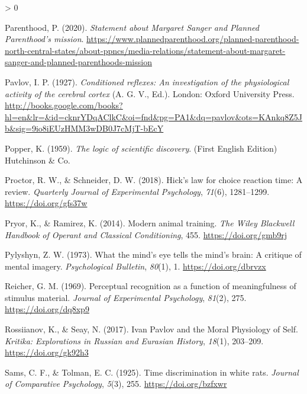 \documentclass[
  oneside,
  12pt]{crumpbook}
\newlength{\cslhangindent}
\newenvironment{CSLReferences}[2] %
 {%
  \setlength{\parindent}{0pt}
  \ifodd #1 \everypar{\setlength{\hangindent}{\cslhangindent}}\ignorespaces\fi
  \ifnum #2 > 0
  \setlength{\parskip}{#2\baselineskip}
  \fi
 }%
 {}
\begin{document}
\begin{CSLReferences}{1}{0}
\leavevmode\hypertarget{ref-plannedparenthoodStatementMargaretSanger2020}{}%
Parenthood, P. (2020). \emph{Statement about {Margaret Sanger} and {Planned Parenthood}'s mission}. \url{https://www.plannedparenthood.org/planned-parenthood-north-central-states/about-ppncs/media-relations/statement-about-margaret-sanger-and-planned-parenthoods-mission}

\leavevmode\hypertarget{ref-pavlovConditionedReflexesInvestigation1927}{}%
Pavlov, I. P. (1927). \emph{Conditioned reflexes: {An} investigation of the physiological activity of the cerebral cortex} (A. G. V., Ed.). {London: Oxford University Press}. \url{http://books.google.com/books?hl=en\&lr=\&id=cknrYDqAClkC\&oi=fnd\&pg=PA1\&dq=pavlov\&ots=KAnkq8Z5Jb\&sig=9io8iEUzHMM3wDB0J7cMjT-bEcY}

\leavevmode\hypertarget{ref-popperLogicScientificDiscovery1959}{}%
Popper, K. (1959). \emph{The logic of scientific discovery}. {(First English Edition) Hutchinson \& Co}.

\leavevmode\hypertarget{ref-proctorHickLawChoice2018}{}%
Proctor, R. W., \& Schneider, D. W. (2018). Hick's law for choice reaction time: {A} review. \emph{Quarterly Journal of Experimental Psychology}, \emph{71}(6), 1281--1299. \url{https://doi.org/gfs37w}

\leavevmode\hypertarget{ref-pryorModernAnimalTraining2014}{}%
Pryor, K., \& Ramirez, K. (2014). Modern animal training. \emph{The Wiley Blackwell Handbook of Operant and Classical Conditioning}, 455. \url{https://doi.org/gmb9rj}

\leavevmode\hypertarget{ref-pylyshynWhatMindEye1973}{}%
Pylyshyn, Z. W. (1973). What the mind's eye tells the mind's brain: {A} critique of mental imagery. \emph{Psychological Bulletin}, \emph{80}(1), 1. \url{https://doi.org/dbrvzx}

\leavevmode\hypertarget{ref-reicherPerceptualRecognitionFunction1969}{}%
Reicher, G. M. (1969). Perceptual recognition as a function of meaningfulness of stimulus material. \emph{Journal of Experimental Psychology}, \emph{81}(2), 275. \url{https://doi.org/dq8xp9}

\leavevmode\hypertarget{ref-rossiianovIvanPavlovMoral2017}{}%
Rossiianov, K., \& Seay, N. (2017). Ivan {Pavlov} and the {Moral Physiology} of {Self}. \emph{Kritika: Explorations in Russian and Eurasian History}, \emph{18}(1), 203--209. \url{https://doi.org/gk92h3}

\leavevmode\hypertarget{ref-samsTimeDiscriminationWhite1925}{}%
Sams, C. F., \& Tolman, E. C. (1925). Time discrimination in white rats. \emph{Journal of Comparative Psychology}, \emph{5}(3), 255. \url{https://doi.org/bzfxwr}


\end{CSLReferences}
\end{document}
